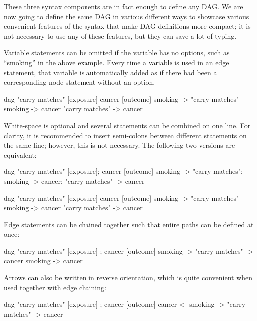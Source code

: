\documentclass[a4paper]{article} %
\newenvironment{dagcode}{%
\begingroup
\small
\verbatim
}{
\endverbatim
\endgroup
}
\begin{document}
These three syntax components are in fact enough to define any DAG. We are now going to define the same DAG in various different ways to showcase various convenient features of the syntax that make DAG definitions more compact; it is not necessary to use any of these features, but they can save a lot of typing.

Variable statements can be omitted if the variable has no options, such as ``smoking'' in the above example. Every time a variable is used in an edge statement, that variable is automatically added as if there had been a corresponding node statement without an option.

\begin{dagcode}
dag{ 
  "carry matches" [exposure]
  cancer [outcome]
  smoking -> "carry matches"
  smoking -> cancer
  "carry matches" -> cancer
}
\end{dagcode}


White-space is optional and several statements can be combined on one line. For clarity, it is recommended to insert semi-colons between different statements on the same line; however, this is not necessary. The following two versions are equivalent:

\begin{dagcode}
dag{ 
  "carry matches" [exposure]; cancer [outcome]
  smoking -> "carry matches"; smoking -> cancer;
  "carry matches" -> cancer
}
\end{dagcode}

\begin{dagcode}
dag{ 
  "carry matches" [exposure] cancer [outcome]
  smoking -> "carry matches" smoking -> cancer
  "carry matches" -> cancer
}
\end{dagcode}


Edge statements can be chained together such that entire paths can be defined at once:

\begin{dagcode}
dag{ 
  "carry matches" [exposure] ; cancer [outcome]
  smoking -> "carry matches" -> cancer 
  smoking -> cancer
}
\end{dagcode}

Arrows can also be written in reverse orientation, which is quite convenient when used together with edge chaining:

\begin{dagcode}
dag{ 
  "carry matches" [exposure] ; cancer [outcome]
  cancer <- smoking -> "carry matches" -> cancer 
}
\end{dagcode}
\end{document}
